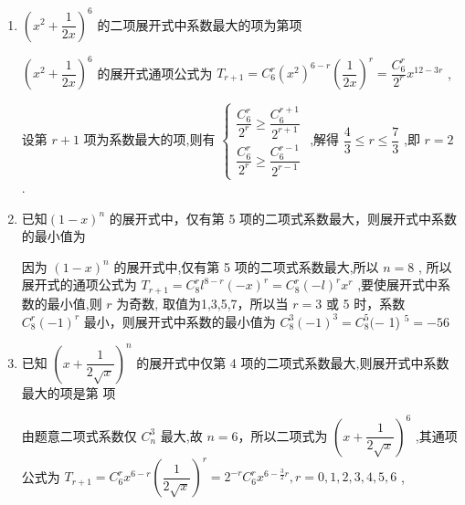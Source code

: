\begin{enumerate}
\begin{enumerate}
\begin{jieda}
            当 $k$ 取奇数时,系数为负值：当 $k = 1$ 时， ${T}_{2} =  - {{192}{x}^{5}}y$ ，当 $k = 3$ 时， ${T}_{4} =  - {{160}{x}^{3}}{y}^{3}$ ，当 $k = 5$ 时， ${T}_{6} =  - {12x}{y}^{5}$ ，所以第 2 项的系数最小;
            
            因为 ${\left( 2x - y\right) }^{6}$ 的展开式有 7 项,所以中间一项的二项式系数最大,即第 $\dfrac{6}{2} + 1 = 4$ 项的二项式系数最大.
        \end{jieda}
        \item ${\left( {x}^{2} + \dfrac{1}{2x}\right) }^{6}$ 的二项展开式中系数最大的项为第项
        \begin{jieda}
            ${\left( {x}^{2} + \dfrac{1}{2x}\right) }^{6}$ 的展开式通项公式为 ${T}_{r + 1} = {{C}}_{6}^{r}{\left( {x}^{2}\right) }^{6 - r}{\left( \dfrac{1}{2x}\right) }^{r} = \dfrac{{{C}}_{6}^{r}}{{2}^{r}}{x}^{{12} - {3r}}$ ,

            设第 $r + 1$ 项为系数最大的项,则有 $\left\{  \begin{array}{l} \dfrac{{{C}}_{6}^{r}}{{2}^{r}} \geq  \dfrac{{{C}}_{6}^{r + 1}}{{2}^{r + 1}} \\  \dfrac{{{C}}_{6}^{r}}{{2}^{r}} \geq  \dfrac{{{C}}_{6}^{r - 1}}{{2}^{r - 1}} \end{array}\right.$ ,解得 $\dfrac{4}{3} \leq  r \leq  \dfrac{7}{3}$ ,即 $r = 2$ .
        \end{jieda}
        \item 已知$(1-x)^{n}$ 的展开式中，仅有第 5 项的二项式系数最大，则展开式中系数的最小值为
        \begin{jieda}
            因为 ${\left( 1 - x\right) }^{n}$ 的展开式中,仅有第 5 项的二项式系数最大,所以 $n = 8$ , 所以展开式的通项公式为 ${T}_{r + 1} = {{C}}_{8}^{r}{l}^{8 - r}{\left( -x\right) }^{r} = {{C}}_{8}^{r}{\left( -l\right) }^{r}{x}^{r}$ ,要使展开式中系数的最小值,则 $r$ 为奇数, 取值为1,3,5,7，所以当 $r = 3$ 或 5 时，系数 ${{C}}_{8}^{r}{\left( -1\right) }^{r}$ 最小，则展开式中系数的最小值为 ${{C}}_{8}^{3}{\left( -1\right) }^{3} = {{C}}_{8}^{5}( -$ 1) ${}^{5} =  - {56}$
        \end{jieda}
        
        \item 已知 ${\left( x + \dfrac{1}{2\sqrt{x}}\right) }^{n}$ 的展开式中仅第 4 项的二项式系数最大,则展开式中系数最大的项是第  项
        \begin{jieda}
            由题意二项式系数仅 ${{C}}_{n}^{3}$ 最大,故 $n = 6$，所以二项式为 ${\left( x + \dfrac{1}{2\sqrt{x}}\right) }^{6}$ ,其通项公式为 ${{T}}_{r + 1} = {{C}}_{6}^{r}{x}^{6 - r}{\left( \dfrac{1}{2\sqrt{x}}\right) }^{r} = {2}^{-r}{{C}}_{6}^{r}{x}^{6 - \frac{3}{2}r},r = 0,1,2,3,4,5,6$ ,
            

\end{jieda}
\end{enumerate}
\end{enumerate}
